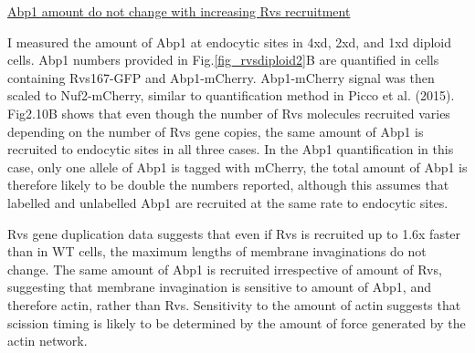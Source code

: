 \underline{Abp1 amount do not change with increasing Rvs recruitment}
		
I measured the amount of Abp1 at endocytic sites in 4xd, 2xd, and 1xd diploid cells. Abp1 numbers provided in Fig.\ref{fig_rvsdiploid2}B are quantified in cells containing Rvs167-GFP and Abp1-mCherry. Abp1-mCherry signal was then scaled to Nuf2-mCherry, similar to quantification method in Picco et al. (2015). Fig2.10B shows that even though the number of Rvs molecules recruited varies depending on the number of Rvs gene copies, the same amount of Abp1 is recruited to endocytic sites in all three cases. In the Abp1 quantification in this case, only one allele of Abp1 is tagged with mCherry, the total amount of Abp1 is therefore likely to be double the numbers reported, although this assumes that labelled and unlabelled Abp1 are recruited at the same rate to endocytic sites. 

Rvs gene duplication data suggests that even if Rvs is recruited up to 1.6x faster than in WT cells, the maximum lengths of membrane invaginations do not change. The same amount of Abp1 is recruited irrespective of amount of Rvs, suggesting that membrane invagination is sensitive to amount of Abp1, and therefore actin, rather than Rvs. Sensitivity to the amount of actin suggests that scission timing is likely to be determined by the amount of force generated by the actin network. 


